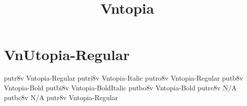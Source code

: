 \documentclass[sample]{vnsample}
\title{Vntopia}
\begin{document}
\section{VnUtopia-Regular}
  {putr8v}   {Vntopia-Regular}
 {putri8v}  {Vntopia-Italic}
 {putro8v}  {Vntopia-Regular}
  {putb8v}   {Vntopia-Bold}
 {putbi8v}  {Vntopia-BoldItalic}
 {putbo8v}  {Vntopia-Bold}
 {putrc8v}  {N/A}
 {putbc8v}  {N/A}
  {putr8v}   {Vntopia-Regular}
\end{document}
